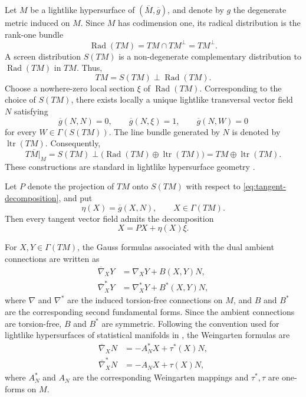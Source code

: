 \documentclass[11pt,a4paper]{article}
\theoremstyle{remark}
\theoremstyle{definition}
\newcommand{\Rad}{\operatorname{Rad}}
\newcommand{\ltr}{\operatorname{ltr}}
\begin{document}
Let $M$ be a lightlike hypersurface of
$(\overline{M},\overline{g})$, and denote by $g$ the degenerate metric
induced on $M$. Since $M$ has codimension one, its radical distribution
is the rank-one bundle
\begin{equation}\label{eq:radical}
\Rad(TM)=TM\cap TM^{\perp}=TM^{\perp}.
\end{equation}
A screen distribution $S(TM)$ is a non-degenerate complementary
distribution to $\Rad(TM)$ in $TM$. Thus,
\begin{equation}\label{eq:tangent-decomposition}
TM=S(TM)\mathbin{\perp}\Rad(TM).
\end{equation}
Choose a nowhere-zero local section $\xi$ of $\Rad(TM)$. Corresponding
to the choice of $S(TM)$, there exists locally a unique lightlike
transversal vector field $N$ satisfying
\begin{equation}\label{eq:null-frame}
\overline{g}(N,N)=0,\qquad
\overline{g}(N,\xi)=1,\qquad
\overline{g}(N,W)=0
\end{equation}
for every $W\in\Gamma(S(TM))$. The line bundle generated by $N$ is
denoted by $\ltr(TM)$. Consequently,
\begin{equation}\label{eq:ambient-decomposition}
T\overline{M}|_{M}
=
S(TM)\mathbin{\perp}
\bigl(\Rad(TM)\oplus\ltr(TM)\bigr)
=
TM\oplus\ltr(TM).
\end{equation}
These constructions are standard in lightlike hypersurface geometry
\cite{DuggalBejancu1996,DuggalJin2007,DuggalSahin2010}.

Let $P$ denote the projection of $TM$ onto $S(TM)$ with respect to
\eqref{eq:tangent-decomposition}, and put
\begin{equation}\label{eq:eta}
\eta(X)=\overline{g}(X,N),\qquad X\in\Gamma(TM).
\end{equation}
Then every tangent vector field admits the decomposition
\begin{equation}\label{eq:projection}
X=PX+\eta(X)\xi.
\end{equation}

For $X,Y\in\Gamma(TM)$, the Gauss formulas associated with the dual
ambient connections are written as
\begin{align}
\overline{\nabla}_{X}Y
&=
\nabla_{X}Y+B(X,Y)N,
\label{eq:gauss}\\
\overline{\nabla}^{*}_{X}Y
&=
\nabla^{*}_{X}Y+B^{*}(X,Y)N,
\label{eq:gauss-star}
\end{align}
where $\nabla$ and $\nabla^{*}$ are the induced torsion-free
connections on $M$, and $B$ and $B^{*}$ are the corresponding second
fundamental forms. Since the ambient connections are torsion-free,
$B$ and $B^{*}$ are symmetric. Following the convention used for lightlike hypersurfaces of statistical
manifolds in \cite{BahadirTripathi2023}, the Weingarten formulas are
\begin{align}
\overline{\nabla}_{X}N
&=
-A^{*}_{N}X+\tau^{*}(X)N,
\label{eq:weingarten}\\
\overline{\nabla}^{*}_{X}N
&=
-A_{N}X+\tau(X)N,
\label{eq:weingarten-star}
\end{align}
where $A^{*}_{N}$ and $A_{N}$ are the corresponding Weingarten mappings
and $\tau^{*},\tau$ are one-forms on $M$.
\end{document}
